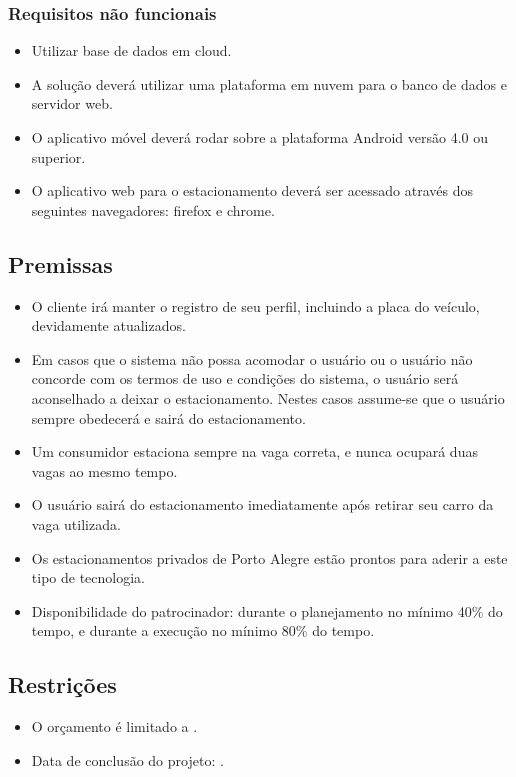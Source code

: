 \subsubsection{Requisitos não funcionais}

\begin{itemize}
	\item Utilizar base de dados em cloud.
	\item A solução deverá utilizar uma plataforma em nuvem para o banco de dados e servidor web.
	\item O aplicativo móvel deverá rodar sobre a plataforma Android versão 4.0 ou superior.
	\item O aplicativo web para o estacionamento deverá ser acessado através dos seguintes navegadores: firefox e chrome.
\end{itemize}

\subsection{Premissas}

\begin{itemize}
	\item O cliente irá manter o registro de seu perfil, incluindo a placa do veículo, devidamente atualizados.
	\item Em casos que o sistema não possa acomodar o usuário ou o usuário não concorde com os termos de uso e condições do sistema, o usuário será aconselhado a deixar o estacionamento. Nestes casos assume-se que o usuário sempre obedecerá e sairá do estacionamento.
	\item Um consumidor estaciona sempre na vaga correta, e nunca ocupará duas vagas ao mesmo tempo.
	\item O usuário sairá do estacionamento imediatamente após retirar seu carro da vaga utilizada.
	\item Os estacionamentos privados de Porto Alegre estão prontos para aderir a este tipo de tecnologia.
	\item Disponibilidade do patrocinador: durante o planejamento no mínimo 40\% do tempo, e durante a execução no mínimo 80\% do tempo.
\end{itemize}

\subsection{Restrições}

\begin{itemize}
	\item O orçamento é limitado a \maximumBudget{}.
	\item Data de conclusão do projeto: \maximumDeadline{}.
\end{itemize}

